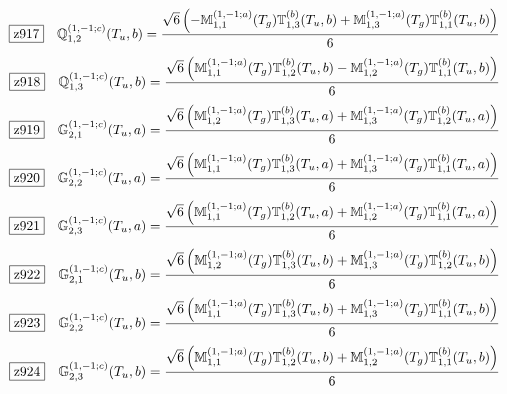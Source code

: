 \documentclass[fleqn,10pt,landscape]{jsarticle}
\begin{document}
\begin{dmath*}
\hspace*{3mm}\fbox{z917}\quad \mathbb{Q}_{1,2}^{(1,-1;c)}(T_{u},b)=\frac{\sqrt{6} \left(- \mathbb{M}_{1,1}^{(1,-1;a)}(T_{g}) \mathbb{T}_{1,3}^{(b)}(T_{u},b) + \mathbb{M}_{1,3}^{(1,-1;a)}(T_{g}) \mathbb{T}_{1,1}^{(b)}(T_{u},b)\right)}{6}
\end{dmath*}
\begin{dmath*}
\hspace*{3mm}\fbox{z918}\quad \mathbb{Q}_{1,3}^{(1,-1;c)}(T_{u},b)=\frac{\sqrt{6} \left(\mathbb{M}_{1,1}^{(1,-1;a)}(T_{g}) \mathbb{T}_{1,2}^{(b)}(T_{u},b) - \mathbb{M}_{1,2}^{(1,-1;a)}(T_{g}) \mathbb{T}_{1,1}^{(b)}(T_{u},b)\right)}{6}
\end{dmath*}
\begin{dmath*}
\hspace*{3mm}\fbox{z919}\quad \mathbb{G}_{2,1}^{(1,-1;c)}(T_{u},a)=\frac{\sqrt{6} \left(\mathbb{M}_{1,2}^{(1,-1;a)}(T_{g}) \mathbb{T}_{1,3}^{(b)}(T_{u},a) + \mathbb{M}_{1,3}^{(1,-1;a)}(T_{g}) \mathbb{T}_{1,2}^{(b)}(T_{u},a)\right)}{6}
\end{dmath*}
\begin{dmath*}
\hspace*{3mm}\fbox{z920}\quad \mathbb{G}_{2,2}^{(1,-1;c)}(T_{u},a)=\frac{\sqrt{6} \left(\mathbb{M}_{1,1}^{(1,-1;a)}(T_{g}) \mathbb{T}_{1,3}^{(b)}(T_{u},a) + \mathbb{M}_{1,3}^{(1,-1;a)}(T_{g}) \mathbb{T}_{1,1}^{(b)}(T_{u},a)\right)}{6}
\end{dmath*}
\begin{dmath*}
\hspace*{3mm}\fbox{z921}\quad \mathbb{G}_{2,3}^{(1,-1;c)}(T_{u},a)=\frac{\sqrt{6} \left(\mathbb{M}_{1,1}^{(1,-1;a)}(T_{g}) \mathbb{T}_{1,2}^{(b)}(T_{u},a) + \mathbb{M}_{1,2}^{(1,-1;a)}(T_{g}) \mathbb{T}_{1,1}^{(b)}(T_{u},a)\right)}{6}
\end{dmath*}
\begin{dmath*}
\hspace*{3mm}\fbox{z922}\quad \mathbb{G}_{2,1}^{(1,-1;c)}(T_{u},b)=\frac{\sqrt{6} \left(\mathbb{M}_{1,2}^{(1,-1;a)}(T_{g}) \mathbb{T}_{1,3}^{(b)}(T_{u},b) + \mathbb{M}_{1,3}^{(1,-1;a)}(T_{g}) \mathbb{T}_{1,2}^{(b)}(T_{u},b)\right)}{6}
\end{dmath*}
\begin{dmath*}
\hspace*{3mm}\fbox{z923}\quad \mathbb{G}_{2,2}^{(1,-1;c)}(T_{u},b)=\frac{\sqrt{6} \left(\mathbb{M}_{1,1}^{(1,-1;a)}(T_{g}) \mathbb{T}_{1,3}^{(b)}(T_{u},b) + \mathbb{M}_{1,3}^{(1,-1;a)}(T_{g}) \mathbb{T}_{1,1}^{(b)}(T_{u},b)\right)}{6}
\end{dmath*}
\begin{dmath*}
\hspace*{3mm}\fbox{z924}\quad \mathbb{G}_{2,3}^{(1,-1;c)}(T_{u},b)=\frac{\sqrt{6} \left(\mathbb{M}_{1,1}^{(1,-1;a)}(T_{g}) \mathbb{T}_{1,2}^{(b)}(T_{u},b) + \mathbb{M}_{1,2}^{(1,-1;a)}(T_{g}) \mathbb{T}_{1,1}^{(b)}(T_{u},b)\right)}{6}
\end{dmath*}
\vspace{5mm}
\end{document}
